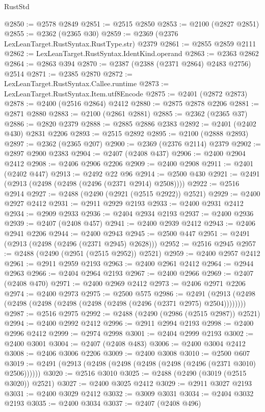 \begin{lexlean}{RustStd}
\begin{coremodule}
{\begin{coremodule}
{{{{{{{{{{{{{{{{{{{{{{{{{{{{{{{{{{{{{{{{{{{{{{{{{{@2850 := @2578 @2849
@2851 := @2515 @2850
@2853 := @2100 (@2827 @2851)
@2855 := @2362 (@2365 @30)
@2859 := @2369 (@2376 LexLeanTarget.RustSyntax.RustType.str) @2379
@2861 := @2855 @2859 @2111
@2862 := LexLeanTarget.RustSyntax.IdentKind.operand
@2863 := @2363 @2862
@2864 := @2863 @394
@2870 := @2387 (@2388 (@2371 @2864) @2483 @2756) @2514
@2871 := @2385 @2870
@2872 := LexLeanTarget.RustSyntax.Callee.runtime
@2873 := LexLeanTarget.RustSyntax.Item.utf8Encode
@2875 := @2401 (@2872 @2873)
@2878 := @2400 (@2516 @2864) @2412
@2880 := @2875 @2878 @2206
@2881 := @2871 @2880
@2883 := @2100 (@2861 @2881)
@2885 := @2362 (@2365 @37)
@2886 := @2820 @2379
@2888 := @2885 @2886 @2383
@2892 := @2401 (@2402 @430) @2831 @2206
@2893 := @2515 @2892
@2895 := @2100 (@2888 @2893)
@2897 := @2362 (@2365 @207)
@2900 := @2369 (@2376 @2114) @2379
@2902 := @2897 @2900 @2383
@2904 := @2407 (@2408 @437)
@2906 := @2400 @2904 @2412
@2908 := @2406 @2906 @2206
@2909 := @2400 @2908
@2911 := @2401 (@2402 @447)
@2913 := @2492 @22 @96
@2914 := @2500 @430
@2921 := @2491 (@2913 (@2498 (@2498 (@2496 (@2371 @2914) @2508))))
@2922 := @2516 @2914
@2927 := @2488 (@2490 (@2921 (@2515 @2922)) @2521)
@2929 := @2400 @2927 @2412
@2931 := @2911 @2929 @2193
@2933 := @2400 @2931 @2412
@2934 := @2909 @2933
@2936 := @2404 @2934 @2193
@2937 := @2400 @2936
@2939 := @2407 (@2408 @457)
@2941 := @2400 @2939 @2412
@2943 := @2406 @2941 @2206
@2944 := @2400 @2943
@2945 := @2500 @447
@2951 := @2491 (@2913 (@2498 (@2496 (@2371 @2945) @2628)))
@2952 := @2516 @2945
@2957 := @2488 (@2490 (@2951 (@2515 @2952)) @2521)
@2959 := @2400 @2957 @2412
@2961 := @2911 @2959 @2193
@2963 := @2400 @2961 @2412
@2964 := @2944 @2963
@2966 := @2404 @2964 @2193
@2967 := @2400 @2966
@2969 := @2407 (@2408 @470)
@2971 := @2400 @2969 @2412
@2973 := @2406 @2971 @2206
@2974 := @2400 @2973
@2975 := @2500 @575
@2986 := @2491 (@2913 (@2498 (@2498 (@2498 (@2498 (@2498 (@2498 (@2496 (@2371 @2975) @2504))))))))
@2987 := @2516 @2975
@2992 := @2488 (@2490 (@2986 (@2515 @2987)) @2521)
@2994 := @2400 @2992 @2412
@2996 := @2911 @2994 @2193
@2998 := @2400 @2996 @2412
@2999 := @2974 @2998
@3001 := @2404 @2999 @2193
@3002 := @2400 @3001
@3004 := @2407 (@2408 @483)
@3006 := @2400 @3004 @2412
@3008 := @2406 @3006 @2206
@3009 := @2400 @3008
@3010 := @2500 @607
@3019 := @2491 (@2913 (@2498 (@2498 (@2498 (@2498 (@2496 (@2371 @3010) @2506))))))
@3020 := @2516 @3010
@3025 := @2488 (@2490 (@3019 (@2515 @3020)) @2521)
@3027 := @2400 @3025 @2412
@3029 := @2911 @3027 @2193
@3031 := @2400 @3029 @2412
@3032 := @3009 @3031
@3034 := @2404 @3032 @2193
@3035 := @2400 @3034
@3037 := @2407 (@2408 @496)
}}}}}}}}}}}}}}}}}}}}}}}}}}}}}}}}}}}}}}}}}}}}}}}}}}
\end{coremodule}}
\end{coremodule}
\end{lexlean}

